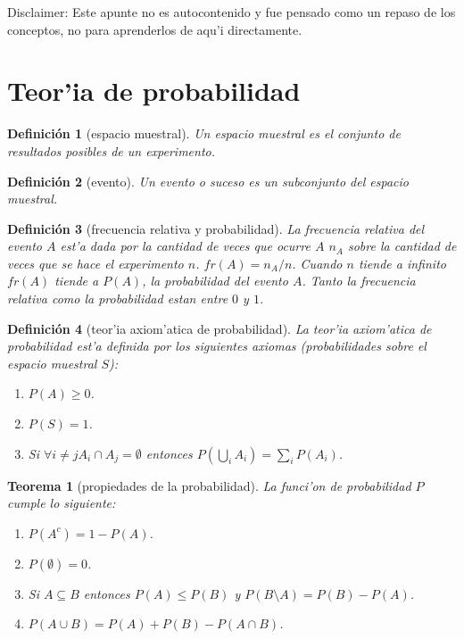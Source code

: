 \documentclass[a4paper,spanish]{article}
\newtheorem{teo}{Teorema}
\newtheorem{defi}{Definici\'on}
\begin{document}
Disclaimer: Este apunte no es autocontenido y fue pensado como un repaso 
de los conceptos, no para aprenderlos de aqu'i directamente.

\section{Teor'ia de probabilidad}

\begin{defi}[espacio muestral]
Un \emph{espacio muestral} es el conjunto de resultados posibles de un
experimento.
\end{defi}

\begin{defi}[evento]
Un \emph{evento} o \emph{suceso} es un subconjunto del espacio muestral.
\end{defi}

\begin{defi}[frecuencia relativa y probabilidad]
La \emph{frecuencia relativa} del evento $A$ est'a dada por la cantidad de 
veces que ocurre $A$ $n_A$ sobre la cantidad de veces que se hace el 
experimento $n$. $fr(A) = n_A/ n$. Cuando $n$ tiende a infinito $fr(A)$ tiende
a $P(A)$, la probabilidad del evento $A$. Tanto la frecuencia relativa como la
probabilidad estan entre $0$ y $1$.
\end{defi}

\begin{defi}[teor'ia axiom'atica de probabilidad]
La teor'ia axiom'atica de probabilidad est'a definida por los siguientes
axiomas (probabilidades sobre el espacio muestral $S$):
\begin{enumerate}
\item $P(A) \geq 0$.
\item $P(S) = 1$.
\item Si $\forall i \neq j A_i \cap A_j = \emptyset$ entonces 
$P(\bigcup_i A_i) = \sum_i P(A_i)$.
\end{enumerate}
\end{defi}

\begin{teo}[propiedades de la probabilidad]
La funci'on de probabilidad $P$ cumple lo siguiente:
\begin{enumerate}
\item $P(A^c) = 1 - P(A)$.
\item $P(\emptyset) = 0$.
\item Si $A \subseteq B$ entonces $P(A) \leq P(B)$ y 
	$P(B \setminus A) = P(B) - P(A)$.
\item $P(A \cup B) = P(A) + P(B) - P(A \cap B)$.
\end{enumerate}
\end{teo}
\end{document}
